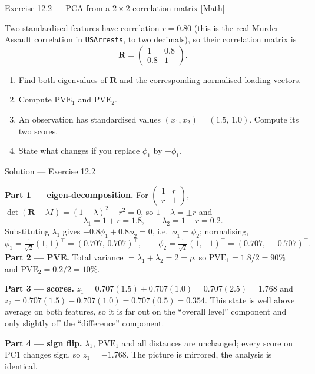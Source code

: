 \documentclass[aspectratio=169,11pt]{beamer}
\begin{document}
\begin{frame}{Exercise 12.2 --- PCA from a $2\times2$ correlation matrix [Math]}
\begin{exercise}
  Two standardised features have correlation $r=0.80$ (this is the real
  Murder--Assault correlation in \texttt{USArrests}, to two decimals), so their
  correlation matrix is
  \[
    \mathbf{R}=\begin{pmatrix}1 & 0.8\\ 0.8 & 1\end{pmatrix}.
  \]
  \begin{enumerate}
    \item Find both eigenvalues of $\mathbf{R}$ and the corresponding normalised loading
          vectors.
    \item Compute $\mathrm{PVE}_1$ and $\mathrm{PVE}_2$.
    \item An observation has standardised values $(x_1,x_2)=(1.5,\,1.0)$. Compute its two
          scores.
    \item State what changes if you replace $\phi_1$ by $-\phi_1$.
  \end{enumerate}
\end{exercise}
\end{frame}

\begin{frame}{Solution --- Exercise 12.2}
  \footnotesize
\begin{solutionbox}
  \textbf{Part 1 --- eigen-decomposition.} For $\begin{pmatrix}1&r\\r&1\end{pmatrix}$,
  $\det(\mathbf{R}-\lambda I)=(1-\lambda)^2-r^2=0$, so $1-\lambda=\pm r$ and
  \[
    \lambda_1=1+r=1.8,\qquad \lambda_2=1-r=0.2 .
  \]
  Substituting $\lambda_1$ gives $-0.8\phi_1+0.8\phi_2=0$, i.e.\ $\phi_1=\phi_2$; normalising,
  \[
    \phi_1=\tfrac{1}{\sqrt2}(1,1)^\top=(0.707,\,0.707)^\top,\qquad
    \phi_2=\tfrac{1}{\sqrt2}(1,-1)^\top=(0.707,\,-0.707)^\top .
  \]
  \textbf{Part 2 --- PVE.} Total variance $=\lambda_1+\lambda_2=2=p$, so
  $\mathrm{PVE}_1=1.8/2=90\%$ and $\mathrm{PVE}_2=0.2/2=10\%$.

  \medskip
  \textbf{Part 3 --- scores.}
  $z_1=0.707(1.5)+0.707(1.0)=0.707(2.5)=1.768$ and
  $z_2=0.707(1.5)-0.707(1.0)=0.707(0.5)=0.354$.
  This state is well above average on both features, so it is far out on the ``overall
  level'' component and only slightly off the ``difference'' component.

  \medskip
  \textbf{Part 4 --- sign flip.} $\lambda_1$, $\mathrm{PVE}_1$ and all distances are
  unchanged; every score on PC1 changes sign, so $z_1=-1.768$. The picture is mirrored,
  the analysis is identical.
\end{solutionbox}
\end{frame}
\end{document}
